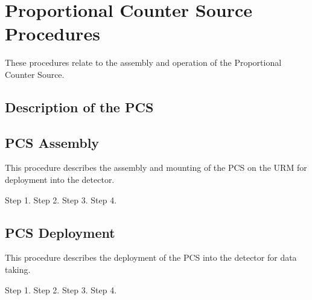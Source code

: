 

  
\section{Proportional Counter Source Procedures}

  These procedures relate to the  assembly and operation of
the Proportional Counter Source.
  

\subsection{Description of the PCS}




\newpage
\subsection{PCS Assembly}

 


 
This procedure describes the assembly and mounting of the
PCS on the URM for deployment into the detector.

\begin{enumerate}
\checkitem Step 1.
\checkitem Step 2.
\checkitem Step 3.
\checkitem Step 4.
\end{enumerate}


\newpage
\subsection{PCS Deployment}

 


 
This procedure describes the deployment of the PCS into the detector
for data taking.


\begin{enumerate}
\checkitem Step 1.
\checkitem Step 2.
\checkitem Step 3.
\checkitem Step 4.
\end{enumerate}

